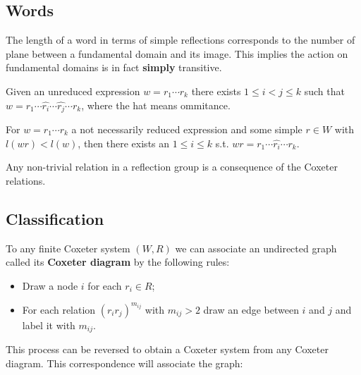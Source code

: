 \documentclass[../main.tex]{subfiles}
\begin{document}
\subsection{Words}

The length of a word in terms of simple reflections corresponds to the number of plane between a fundamental domain and its image. This implies the action on fundamental domains is in fact \textbf{simply} transitive.

\begin{proposition}
    Given an unreduced expression $w=r_1\cdots r_k$ there exists $1\leq i < j \leq k$ such that $w=r_1\cdots\hat{r_i}\cdots\hat{r_j}\cdots r_k$, where the hat means ommitance.
\end{proposition}

\begin{proposition}
    For $w=r_1\cdots r_k$ a not necessarily reduced expression and some simple $r\in W$ with $l(wr)<l(w)$, then there exists an $1\leq i\leq k$ s.t. $wr = r_1\cdots\hat{r_i}\cdots r_k$.
\end{proposition}

\begin{theorem}
    Any non-trivial relation in a reflection group is a consequence of the Coxeter relations.
\end{theorem}

\subsection{Classification}

To any finite Coxeter system $(W,R)$ we can associate an undirected graph called its \textbf{Coxeter diagram} by the following rules:\begin{itemize}
    \item Draw a node $i$ for each $r_i\in R$;
    \item For each relation $(r_i r_j)^{m_{ij}}$ with $m_{ij}>2$ draw an edge between $i$ and $j$ and label it with $m_{ij}$.
\end{itemize}

This process can be reversed to obtain a Coxeter system from any Coxeter diagram. This correspondence will associate the graph:
\begin{figure}[!h]
\centering
{}
\end{figure}
\end{document}
